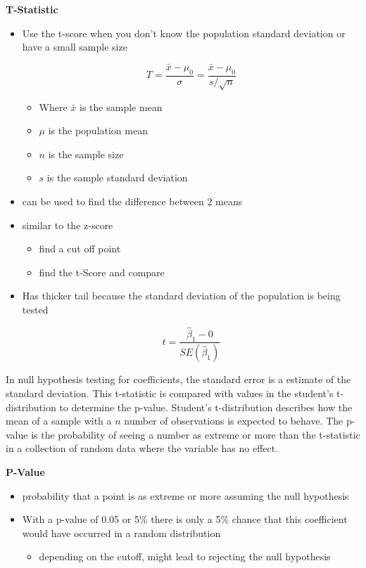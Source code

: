 \documentclass[
]{article}
\begin{document}
\textbf{T-Statistic}

\begin{itemize}
\item
  Use the t-score when you don't know the population standard deviation
  or have a small sample size

  \[T = \frac{\bar{x}-\mu_0}{\sigma} =\frac{\bar{x}-\mu_0}{s/\sqrt{n}}\]

  \begin{itemize}
  \item
    Where \(\bar{x}\) is the sample mean
  \item
    \(\mu\) is the population mean
  \item
    \(n\) is the sample size
  \item
    \(s\) is the sample standard deviation
  \end{itemize}
\item
  can be used to find the difference between 2 means
\item
  similar to the z-score

  \begin{itemize}
  \item
    find a cut off point
  \item
    find the t-Score and compare
  \end{itemize}
\item
  Has thicker tail because the standard deviation of the population is
  being tested

  \[t = \frac{\hat\beta_1 - 0}{SE(\hat\beta_1)}\]
\end{itemize}

In null hypothesis testing for coefficients, the standard error is a
estimate of the standard deviation. This t-statistic is compared with
values in the student's t-distribution to determine the p-value.
Student's t-distribution describes how the mean of a sample with a \(n\)
number of observations is expected to behave. The p-value is the
probability of seeing a number as extreme or more than the t-statistic
in a collection of random data where the variable has no effect.

\textbf{P-Value}

\begin{itemize}
\item
  probability that a point is as extreme or more assuming the null
  hypothesis
\item
  With a p-value of 0.05 or 5\% there is only a 5\% chance that this
  coefficient would have occurred in a random distribution

  \begin{itemize}
  \item
    depending on the cutoff, might lead to rejecting the null hypothesis
  \end{itemize}
\end{itemize}
\end{document}
